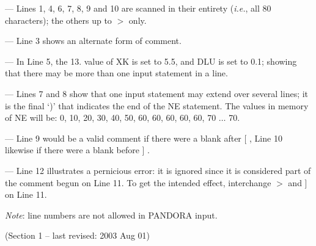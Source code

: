 \blankline
\blankline
\blankline
\blankline
--- Lines 1, 4, 6, 7, 8, 9 and 10 are scanned in their entirety
({\it i.e.}, all 80 characters); the others up to $>$ only.
 
--- Line 3 shows an alternate form of comment.
 
--- In Line 5, the 13. value of XK is set to 5.5, and DLU is set
to 0.1; showing that there may be more than one input statement in a line.
 
--- Lines 7 and 8 show that one input statement may extend over
several lines; it is the final `)' that indicates the end of the NE statement.
The values in memory of NE will be:
0, 10, 20, 30, 40, 50, 60, 60, 60, 60, 60, 70 $\ldots$ 70.
 
--- Line 9 would be a valid comment if there were a blank after [ , Line 10
likewise if there were a blank before  ] .
 
--- Line 12 illustrates a pernicious
error: it is ignored since it is considered part of the comment begun
on Line 11. To get the intended effect, interchange $>$ and ] on Line 11.
\blankline
\centerline{{\it Note}: line numbers are not allowed in PANDORA input.}
\noindent (Section 1 -- last revised: 2003 Aug 01) \par
{}
\ej
